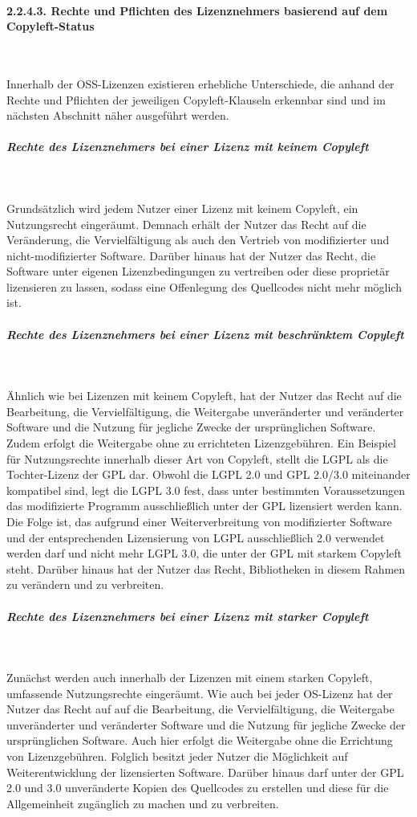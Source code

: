 \paragraph{2.2.4.3. Rechte und Pflichten des Lizenznehmers basierend auf dem Copyleft-Status}$~$

Innerhalb der OSS-Lizenzen existieren erhebliche Unterschiede, die anhand der Rechte und Pflichten der jeweiligen Copyleft-Klauseln erkennbar sind und im nächsten Abschnitt näher ausgeführt werden. 

\subparagraph{Rechte des Lizenznehmers bei einer Lizenz mit keinem Copyleft}$~$

Grundsätzlich wird jedem Nutzer einer Lizenz mit keinem Copyleft, ein Nutzungsrecht eingeräumt. Demnach erhält der Nutzer das Recht auf die Veränderung, die Vervielfältigung als auch den Vertrieb von modifizierter und nicht-modifizierter Software. \cite[S. 14]{bitkom_open_nodate} Darüber hinaus hat der Nutzer das Recht, die Software unter eigenen Lizenzbedingungen zu vertreiben oder diese proprietär lizensieren zu lassen, sodass eine Offenlegung des Quellcodes nicht mehr möglich ist.

\subparagraph{Rechte des Lizenznehmers bei einer Lizenz mit beschränktem Copyleft}$~$

Ähnlich wie bei Lizenzen mit keinem Copyleft, hat der Nutzer das Recht auf die Bearbeitung, die Vervielfältigung, die Weitergabe unveränderter und veränderter Software und die Nutzung für jegliche Zwecke der ursprünglichen Software. \cite[S. 11]{bitkom_open_nodate} Zudem erfolgt die Weitergabe ohne zu errichteten Lizenzgebühren. Ein Beispiel für Nutzungsrechte innerhalb dieser Art von Copyleft, stellt die LGPL als die Tochter-Lizenz der GPL dar. Obwohl die LGPL 2.0 und GPL 2.0/3.0 miteinander kompatibel sind, legt die LGPL 3.0 fest, dass unter bestimmten Voraussetzungen das modifizierte Programm ausschließlich unter der GPL lizensiert werden kann. \cite[S. 52]{schaaf_open-source-lizenzen_2013} Die Folge ist, das aufgrund einer Weiterverbreitung von modifizierter Software und der entsprechenden Lizensierung von LGPL ausschließlich 2.0 verwendet werden darf und nicht mehr LGPL 3.0, die unter der GPL mit starkem Copyleft steht. \cite[S. 52]{schaaf_open-source-lizenzen_2013} Darüber hinaus hat der Nutzer das Recht, Bibliotheken in diesem Rahmen zu verändern und zu verbreiten. 

\subparagraph{Rechte des Lizenznehmers bei einer Lizenz mit starker Copyleft}$~$

Zunächst werden auch innerhalb der Lizenzen mit einem starken Copyleft, umfassende Nutzungsrechte eingeräumt. Wie auch bei jeder OS-Lizenz hat der Nutzer das Recht auf auf die Bearbeitung, die Vervielfältigung, die Weitergabe unveränderter und veränderter Software und die Nutzung für jegliche Zwecke der ursprünglichen Software. \cite[S. 9]{bitkom_open_nodate} Auch hier erfolgt die Weitergabe ohne die Errichtung von Lizenzgebühren. Folglich besitzt jeder Nutzer die Möglichkeit auf Weiterentwicklung der lizensierten Software. Darüber hinaus darf unter der GPL 2.0 und 3.0 unveränderte Kopien des Quellcodes zu erstellen und diese für die Allgemeinheit zugänglich zu machen und zu verbreiten.

